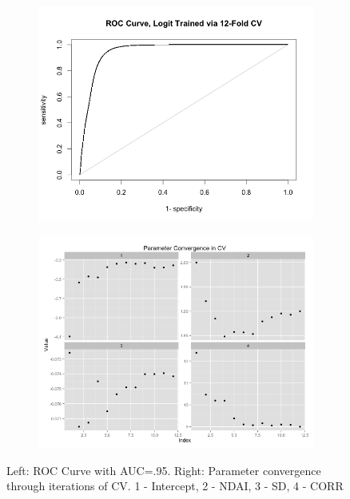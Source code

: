 \documentclass{article}\usepackage[]{graphicx}\usepackage[]{color}
\begin{document}
\begin{figure}[h]
  \centering 
  \begin{subfigure}[b]{0.35\textwidth}
    \includegraphics[width=\linewidth]{LogitROC.png}
    \label{ROC}
  \end{subfigure} 
  \begin{subfigure}[b]{0.35\textwidth}
    \includegraphics[width=\linewidth]{ParameterConvergence.png}
    \label{Convergence in CV}
  \end{subfigure}  
    \caption{Left: ROC Curve with AUC=.95. Right: Parameter convergence through iterations of CV. 1 - Intercept, 2 - NDAI, 3 - SD, 4 - CORR}
\end{figure}
\end{document}
